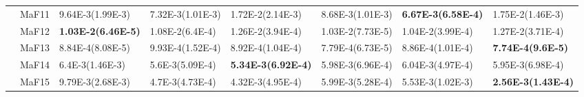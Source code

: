 \documentclass[]{article}
\begin{document}
\begin{landscape}
\begin{table}
\begin{footnotesize}
\begin{tabular}{|l|l|l|l|l|l|l|l|}
 & MaF11 & 9.64E-3(1.99E-3) & \cellcolor{gray95} 7.32E-3(1.01E-3) & 1.72E-2(2.14E-3) & 8.68E-3(1.01E-3) & \cellcolor{gray95} {\bf 6.67E-3(6.58E-4)} & 1.75E-2(1.46E-3)\\
 & MaF12 & \cellcolor{gray95} {\bf 1.03E-2(6.46E-5)} & \cellcolor{gray95} 1.08E-2(6.4E-4) & 1.26E-2(3.94E-4) & \cellcolor{gray95} 1.03E-2(7.73E-5) & \cellcolor{gray95} 1.04E-2(3.99E-4) & 1.27E-2(3.71E-4)\\
 & MaF13 & 8.84E-4(8.08E-5) & 9.93E-4(1.52E-4) & 8.92E-4(1.04E-4) & \cellcolor{gray95} 7.79E-4(6.73E-5) & 8.86E-4(1.01E-4) & \cellcolor{gray95} {\bf 7.74E-4(9.6E-5)}\\
 & MaF14 & 6.4E-3(1.46E-3) & \cellcolor{gray95} 5.6E-3(5.09E-4) & \cellcolor{gray95} {\bf 5.34E-3(6.92E-4)} & 5.98E-3(6.96E-4) & 6.04E-3(4.97E-4) & 5.95E-3(6.98E-4)\\
 & MaF15 & 9.79E-3(2.68E-3) & 4.7E-3(4.73E-4) & \cellcolor{gray95} 4.32E-3(4.95E-4) & 5.99E-3(5.28E-4) & 5.53E-3(1.02E-3) & \cellcolor{gray95} {\bf 2.56E-3(1.43E-4)}\\
\hline


\end{tabular}
\end{footnotesize}
\end{table}
\end{landscape}
\end{document}
